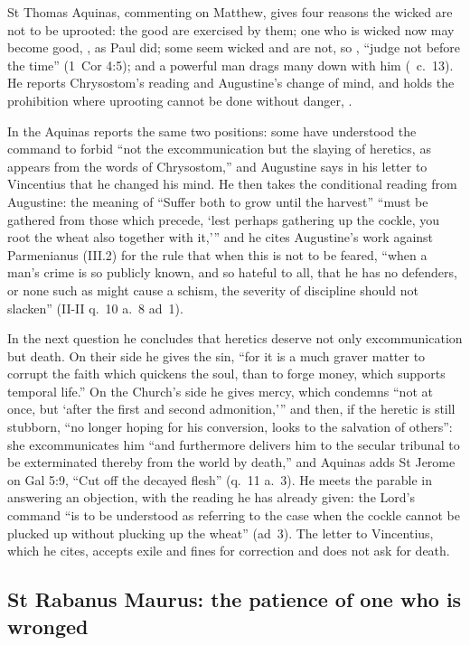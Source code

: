 St Thomas Aquinas, commenting on Matthew, gives four reasons the wicked are
not to be uprooted: the good are exercised by them; one who is wicked now may
become good, , as Paul did; some seem wicked and are not, so
, ``judge not before the time'' (1~Cor
4:5); and a powerful man drags many down with him (\ c.~13).
He reports Chrysostom's reading and Augustine's change of mind, and holds the
prohibition where uprooting cannot be done without danger, .

In the  Aquinas reports the same two positions: some have
understood the command to forbid ``not the excommunication but the slaying of
heretics, as appears from the words of Chrysostom,'' and Augustine says in his
letter to Vincentius that he changed his mind. He then takes the conditional
reading from Augustine: the meaning of ``Suffer both to grow until the
harvest'' ``must be gathered from those which precede, `lest perhaps gathering
up the cockle, you root the wheat also together with it,''' and he cites
Augustine's work against Parmenianus (III.2) for the rule that when this is
not to be feared, ``when a man's crime is so publicly known, and so hateful to
all, that he has no defenders, or none such as might cause a schism, the
severity of discipline should not slacken'' (II-II q.~10 a.~8 ad~1).

In the next question he concludes that heretics deserve not only
excommunication but death. On their side he gives the sin, ``for it is a much
graver matter to corrupt the faith which quickens the soul, than to forge
money, which supports temporal life.'' On the Church's side he gives mercy,
which condemns ``not at once, but `after the first and second admonition,'''
and then, if the heretic is still stubborn, ``no longer hoping for his
conversion, looks to the salvation of others'': she excommunicates him ``and
furthermore delivers him to the secular tribunal to be exterminated thereby
from the world by death,'' and Aquinas adds St Jerome on Gal 5:9, ``Cut off
the decayed flesh'' (q.~11 a.~3). He meets the parable in answering an
objection, with the reading he has already given: the Lord's command ``is to
be understood as referring to the case when the cockle cannot be plucked up
without plucking up the wheat'' (ad~3). The letter to Vincentius, which he
cites, accepts exile and fines for correction and does not ask for death.

\subsection{St Rabanus Maurus: the patience of one who is wronged}
\label{sec:patience-rabanus}

